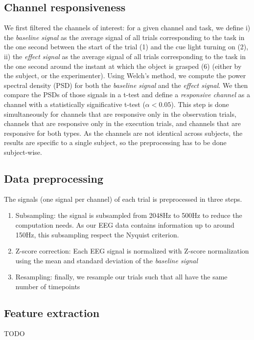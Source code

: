 \documentclass[10pt,conference,compsocconf]{IEEEtran}
\begin{document}
\subsection{Channel responsiveness}
We first filtered the channels of interest: for a given channel and task, we define i) the \textit{baseline signal} as the average signal of all trials corresponding to the task in the one second between the start of the trial (1) and the cue light turning on (2), ii) the \textit{effect signal} as the average signal of all trials corresponding to the task in the one second around the instant at which the object is grasped (6) (either by the subject, or the experimenter). Using Welch's method\cite{welch}, we compute the power spectral density (PSD) for both the \textit{baseline signal} and the \textit{effect signal}. We then compare the PSDs of those signals in a t-test and define a \textit{responsive channel} as a channel with a statistically significative t-test (\(\alpha<0.05\)). This step is done simultaneously for channels that are responsive only in the observation trials, channels that are responsive only in the execution trials, and channels that are responsive for both types. As the channels are not identical across subjects, the results are specific to a single subject, so the preprocessing has to be done subject-wise.

\subsection{Data preprocessing}
The signals (one signal per channel) of each trial is preprocessed in three steps.
\begin{enumerate}
  \item Subsampling: the signal is subsampled from 2048Hz to 500Hz to reduce the computation needs. As our EEG data contains information up to around 150Hz, this subsampling respect the Nyquist criterion.
  \item Z-score correction: Each EEG signal is normalized with Z-score normalization using the mean and standard deviation of the \textit{baseline signal}
  \item Resampling: finally, we resample our trials such that all have the same number of timepoints
\end{enumerate}

\subsection{Feature extraction}
TODO
\end{document}
